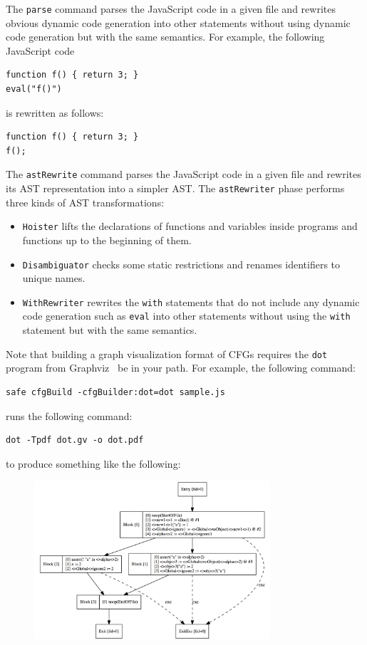 \medskip
The \verb!parse! command parses the JavaScript code in a given file and
rewrites obvious dynamic code generation into other statements without using
dynamic code generation but with the same semantics.  For example, the following
JavaScript code
\begin{verbatim}
function f() { return 3; }
eval("f()")
\end{verbatim}
is rewritten as follows:
\begin{verbatim}
function f() { return 3; }
f();
\end{verbatim}

\medskip
The \verb!astRewrite! command parses the JavaScript code in a given file and
rewrites its AST representation into a simpler AST.
The \verb!astRewriter! phase performs three kinds of AST transformations:
\begin{itemize}
\item \verb!Hoister! lifts the declarations of functions and variables inside
programs and functions up to the beginning of them.
\item \verb!Disambiguator! checks some static restrictions and renames identifiers
to unique names.
\item \verb!WithRewriter! rewrites the \verb!with! statements that do not include
any dynamic code generation such as \verb!eval! into other statements without using
the \verb!with! statement but with the same semantics.
\end{itemize}

Note that building a graph visualization format of CFGs requires the \verb!dot! program
from Graphviz~\cite{graphviz} be in your path.
For example, the following command:
\begin{verbatim}
safe cfgBuild -cfgBuilder:dot=dot sample.js
\end{verbatim}
runs the following command:
\begin{verbatim}
dot -Tpdf dot.gv -o dot.pdf
\end{verbatim}
to produce something like the following:
\begin{figure}[H]
\includegraphics[width=8.75cm]{cfg.png}
\end{figure}

